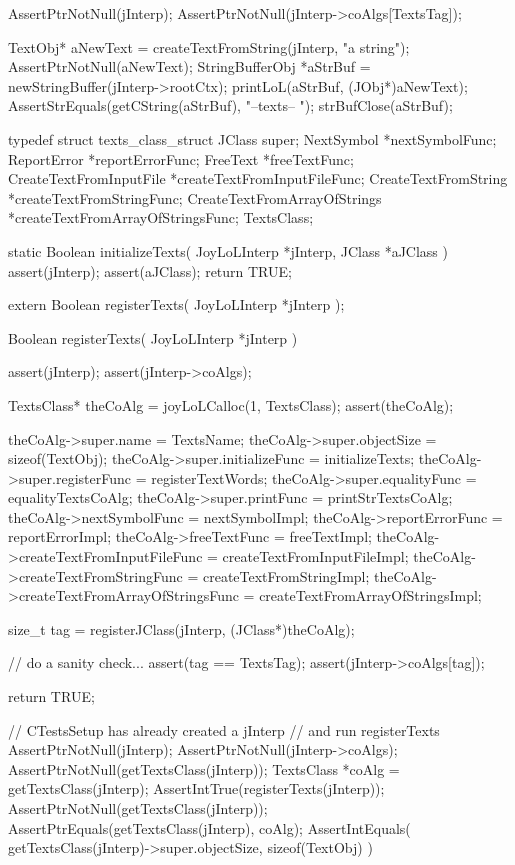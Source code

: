 
\startCTest
  AssertPtrNotNull(jInterp);
  AssertPtrNotNull(jInterp->coAlgs[TextsTag]);

  TextObj* aNewText = createTextFromString(jInterp, "a string");
  AssertPtrNotNull(aNewText);
  StringBufferObj *aStrBuf = newStringBuffer(jInterp->rootCtx);
  printLoL(aStrBuf, (JObj*)aNewText);
  AssertStrEquals(getCString(aStrBuf), "--texts-- ");
  strBufClose(aStrBuf);
\stopCTest
\stopTestCase
\stopTestSuite

\startTestSuite[registerTexts]

\startCHeader
typedef struct texts_class_struct {
  JClass                    super;
  NextSymbol                   *nextSymbolFunc;
  ReportError                  *reportErrorFunc;
  FreeText                     *freeTextFunc;
  CreateTextFromInputFile      *createTextFromInputFileFunc;
  CreateTextFromString         *createTextFromStringFunc;
  CreateTextFromArrayOfStrings *createTextFromArrayOfStringsFunc;
} TextsClass;
\stopCHeader

\startCCode
static Boolean initializeTexts(
  JoyLoLInterp *jInterp,
  JClass   *aJClass
) {
  assert(jInterp);
  assert(aJClass);
  return TRUE;
}
\stopCCode

\startCHeader
extern Boolean registerTexts(
  JoyLoLInterp *jInterp
);
\stopCHeader
{}

\startCCode
Boolean registerTexts(
  JoyLoLInterp *jInterp
) {
  assert(jInterp);
  assert(jInterp->coAlgs);
  
  TextsClass* theCoAlg = joyLoLCalloc(1, TextsClass);
  assert(theCoAlg);
  
  theCoAlg->super.name           = TextsName;
  theCoAlg->super.objectSize     = sizeof(TextObj);
  theCoAlg->super.initializeFunc = initializeTexts;
  theCoAlg->super.registerFunc   = registerTextWords;
  theCoAlg->super.equalityFunc   = equalityTextsCoAlg;
  theCoAlg->super.printFunc      = printStrTextsCoAlg;
  theCoAlg->nextSymbolFunc       = nextSymbolImpl;
  theCoAlg->reportErrorFunc      = reportErrorImpl;
  theCoAlg->freeTextFunc         = freeTextImpl;
  theCoAlg->createTextFromInputFileFunc = 
    createTextFromInputFileImpl;
  theCoAlg->createTextFromStringFunc =
    createTextFromStringImpl;
  theCoAlg->createTextFromArrayOfStringsFunc =
    createTextFromArrayOfStringsImpl;

  size_t tag =
    registerJClass(jInterp, (JClass*)theCoAlg);
  
  // do a sanity check...
  assert(tag == TextsTag);
  assert(jInterp->coAlgs[tag]);

  return TRUE;
}
\stopCCode


\startCTest
  // CTestsSetup has already created a jInterp
  // and run registerTexts
  AssertPtrNotNull(jInterp);
  AssertPtrNotNull(jInterp->coAlgs);
  AssertPtrNotNull(getTextsClass(jInterp));
  TextsClass *coAlg = getTextsClass(jInterp);
  AssertIntTrue(registerTexts(jInterp));
  AssertPtrNotNull(getTextsClass(jInterp));
  AssertPtrEquals(getTextsClass(jInterp), coAlg);
  AssertIntEquals(
    getTextsClass(jInterp)->super.objectSize,
    sizeof(TextObj)
  )
\stopCTest
\stopTestCase
\stopTestSuite
